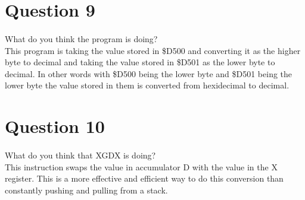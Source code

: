 \documentclass[12pt]{report}
\begin{document}
\section*{Question 9}
	\paragraph{}
		What do you think the program is doing?
		\vspace{1cm}
		\\This program is taking the value stored in \$D500 and converting it as the higher byte to decimal and
		taking the value stored in \$D501 as the lower byte to decimal.  In other words with \$D500 being the lower
		byte and \$D501 being the lower byte the value stored in them is converted from hexidecimal to decimal.
	
\section*{Question 10}
	\paragraph{}
		What do you think that XGDX is doing?
		\vspace{1cm}
		\\This instruction swaps the value in accumulator D with the value in the X register.  This is a more effective
		and efficient way to do this conversion than constantly pushing and pulling from a stack.
		
\end{document}
